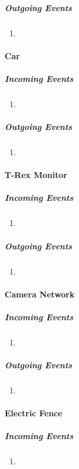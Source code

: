 \documentclass[12pt]{article}
\begin{document}
	    \subparagraph{Outgoing Events}
		\begin{enumerate}
			\item 
		\end{enumerate}

	\paragraph{Car}
	\textit{}
	    \subparagraph{Incoming Events}
		\begin{enumerate}
			\item 
		\end{enumerate}
				
	    \subparagraph{Outgoing Events}
		\begin{enumerate}
			\item 
		\end{enumerate}

    \paragraph{T-Rex Monitor}
	\textit{}
	    \subparagraph{Incoming Events}
		\begin{enumerate}
			\item 
		\end{enumerate}
				
	    \subparagraph{Outgoing Events}
		\begin{enumerate}
			\item 
		\end{enumerate}

	\paragraph{Camera Network}
	\textit{}
	    \subparagraph{Incoming Events}
		\begin{enumerate}
			\item 
		\end{enumerate}
		
	    \subparagraph{Outgoing Events}
		\begin{enumerate}
			\item 
		\end{enumerate}

	\paragraph{Electric Fence}
	\textit{}
	    \subparagraph{Incoming Events}
		\begin{enumerate}
			\item 
		\end{enumerate}
				
\end{document}
